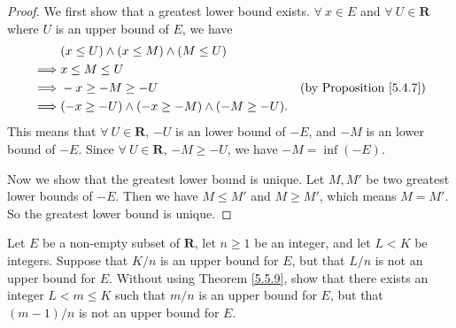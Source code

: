 \begin{proof}
    We first show that a greatest lower bound exists.
    \(\forall\ x \in E\) and \(\forall\ U \in \mathbf{R}\) where \(U\) is an upper bound of \(E\), we have
    \begin{align*}
                 & (x \leq U) \land (x \leq M) \land (M \leq U)                                              \\
        \implies & x \leq M \leq U                                                                           \\
        \implies & -x \geq -M \geq -U                                  & \text{(by Proposition \ref{5.4.7})} \\
        \implies & (-x \geq -U) \land (-x \geq -M) \land (-M \geq -U).
    \end{align*}
    This means that \(\forall\ U \in \mathbf{R}\), \(-U\) is an lower bound of \(-E\), and \(-M\) is an lower bound of \(-E\).
    Since \(\forall\ U \in \mathbf{R}\), \(-M \geq -U\), we have \(-M = \inf(-E)\).

    Now we show that the greatest lower bound is unique.
    Let \(M, M'\) be two greatest lower bounds of \(-E\).
    Then we have \(M \leq M'\) and \(M \geq M'\), which means \(M = M'\).
    So the greatest lower bound is unique.
\end{proof}

\begin{exercise}\label{ex 5.5.2}
    Let \(E\) be a non-empty subset of \(\mathbf{R}\), let \(n \geq 1\) be an integer, and let \(L < K\) be integers.
    Suppose that \(K / n\) is an upper bound for \(E\), but that \(L / n\) is not an upper bound for \(E\).
    Without using Theorem \ref{5.5.9}, show that there exists an integer \(L < m \leq K\) such that \(m / n\) is an upper bound for \(E\), but that \((m - 1) / n\) is not an upper bound for \(E\).
\end{exercise}

